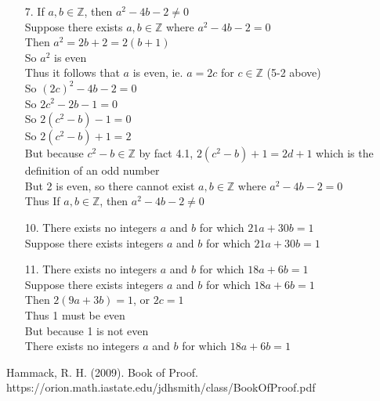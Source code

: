 \documentclass[sigconf]{article}
\begin{document}
\begin{itemize}
\begin{itemize}
      \item[7.] If $a,b\in\mathbb{Z}$, then $a^2-4b-2 \neq 0$\\
                Suppose there exists $a,b\in\mathbb{Z}$ where $a^2-4b-2=0$\\
                Then $a^2=2b+2=2(b+1)$\\
                So $a^2$ is even\\
                Thus it follows that $a$ is even, ie. $a=2c$ for $c\in\mathbb{Z}$ (5-2 above)\\
                So $(2c)^2-4b-2=0$\\
                So $2c^2-2b-1=0$\\
                So $2(c^2-b)-1=0$\\
                So $2(c^2-b)+1=2$\\
                But because $c^2-b\in\mathbb{Z}$ by fact 4.1, $2(c^2-b)+1=2d+1$ which is the definition of an odd number\\
                But 2 is even, so there cannot exist $a,b\in\mathbb{Z}$ where $a^2-4b-2=0$\\
                Thus If $a,b\in\mathbb{Z}$, then $a^2-4b-2 \neq 0$

      \item[10.] There exists no integers $a$ and $b$ for which $21a+30b=1$\\
                Suppose there exists integers $a$ and $b$ for which $21a+30b=1$\\


      \item[11.] There exists no integers $a$ and $b$ for which $18a+6b=1$\\
                Suppose there exists integers $a$ and $b$ for which $18a+6b=1$\\
                Then $2(9a+3b)=1$, or $2c=1$\\
                Thus 1 must be even\\
                But because 1 is not even\\
                There exists no integers $a$ and $b$ for which $18a+6b=1$

    \end{itemize}
\end{itemize}

Hammack, R. H. (2009). Book of Proof. https://orion.math.iastate.edu/jdhsmith/class/BookOfProof.pdf



\end{document}

